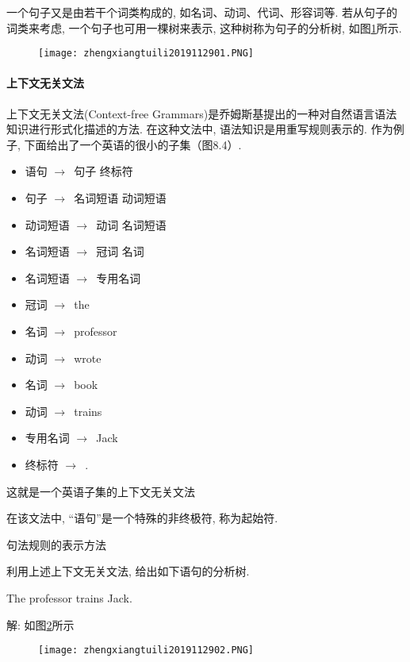 一个句子又是由若干个词类构成的, 如名词、动词、代词、形容词等. 若从句子的词类来考虑, 一个句子也可用一棵树来表示, 这种树称为句子的分析树, 如图\ref{AI32fig2901}所示.
\begin{figure}[H]
\centering
\texttt{[image: zhengxiangtuili2019112901.PNG]}
\caption{}
\label{AI32fig2901}
\end{figure}
\paragraph{上下文无关文法}
上下文无关文法(Context-free  Grammars)是乔姆斯基提出的一种对自然语言语法知识进行形式化描述的方法. 在这种文法中, 语法知识是用重写规则表示的. 作为例子, 下面给出了一个英语的很小的子集（图8.4）.

\begin{itemize}
\item 语句 $\rightarrow$\,  句子   终标符
\item 句子 $\rightarrow$\,  名词短语   动词短语
\item 动词短语 $\rightarrow$\,  动词   名词短语
\item 名词短语 $\rightarrow$\,  冠词   名词
\item 名词短语 $\rightarrow$\,  专用名词
\item 冠词 $\rightarrow$\,  the
\item 名词 $\rightarrow$\,  professor
\item 动词 $\rightarrow$\,  wrote
\item 名词 $\rightarrow$\,  book
\item 动词 $\rightarrow$\,  trains
\item 专用名词 $\rightarrow$\,  Jack
\item 终标符 $\rightarrow$\, .
\end{itemize}
这就是一个英语子集的上下文无关文法

在该文法中, “语句”是一个特殊的非终极符, 称为起始符.

句法规则的表示方法

\begin{example}
利用上述上下文无关文法, 给出如下语句的分析树.

The  professor  trains  Jack.
\end{example}

解: 如图\ref{AI32fig2902}所示
\begin{figure}[H]
\centering
\texttt{[image: zhengxiangtuili2019112902.PNG]}
\caption{}
\label{AI32fig2902}
\end{figure}
